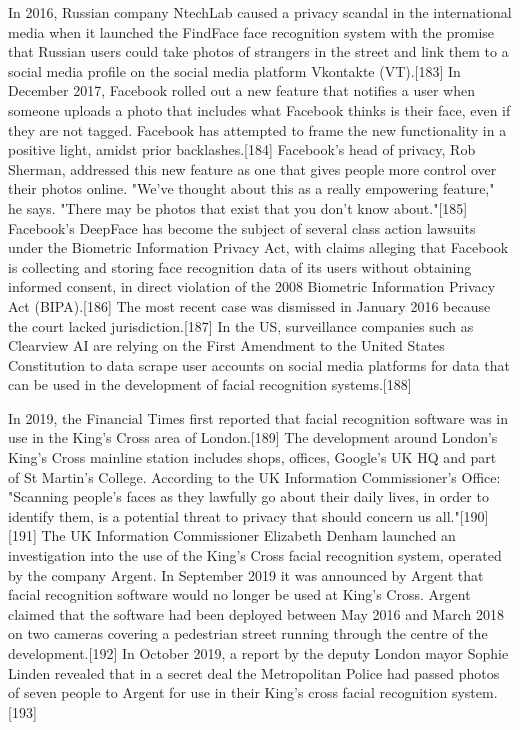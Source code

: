 In 2016, Russian company NtechLab caused a privacy scandal in the international media when it launched the FindFace face recognition system with the promise that Russian users could take photos of strangers in the street and link them to a social media profile on the social media platform Vkontakte (VT).[183] In December 2017, Facebook rolled out a new feature that notifies a user when someone uploads a photo that includes what Facebook thinks is their face, even if they are not tagged. Facebook has attempted to frame the new functionality in a positive light, amidst prior backlashes.[184] Facebook's head of privacy, Rob Sherman, addressed this new feature as one that gives people more control over their photos online. "We've thought about this as a really empowering feature," he says. "There may be photos that exist that you don't know about."[185] Facebook's DeepFace has become the subject of several class action lawsuits under the Biometric Information Privacy Act, with claims alleging that Facebook is collecting and storing face recognition data of its users without obtaining informed consent, in direct violation of the 2008 Biometric Information Privacy Act (BIPA).[186] The most recent case was dismissed in January 2016 because the court lacked jurisdiction.[187] In the US, surveillance companies such as Clearview AI are relying on the First Amendment to the United States Constitution to data scrape user accounts on social media platforms for data that can be used in the development of facial recognition systems.[188]

In 2019, the Financial Times first reported that facial recognition software was in use in the King's Cross area of London.[189] The development around London's King's Cross mainline station includes shops, offices, Google's UK HQ and part of St Martin's College. According to the UK Information Commissioner's Office: "Scanning people's faces as they lawfully go about their daily lives, in order to identify them, is a potential threat to privacy that should concern us all."[190][191] The UK Information Commissioner Elizabeth Denham launched an investigation into the use of the King's Cross facial recognition system, operated by the company Argent. In September 2019 it was announced by Argent that facial recognition software would no longer be used at King's Cross. Argent claimed that the software had been deployed between May 2016 and March 2018 on two cameras covering a pedestrian street running through the centre of the development.[192] In October 2019, a report by the deputy London mayor Sophie Linden revealed that in a secret deal the Metropolitan Police had passed photos of seven people to Argent for use in their King's cross facial recognition system.[193]

